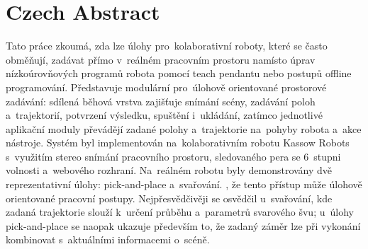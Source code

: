 \section*{Czech Abstract}
%
Tato práce zkoumá, zda lze úlohy pro~kolaborativní roboty, které se často obměňují, zadávat přímo v~reálném pracovním prostoru namísto úprav nízkoúrovňových programů robota pomocí teach pendantu nebo postupů offline programování.
Představuje modulární \DIFdelbegin {}\DIFdelend \DIFaddbegin {}\DIFaddend pro~úlohově orientované prostorové zadávání: sdílená běhová vrstva zajišťuje snímání scény, zadávání poloh a~trajektorií, potvrzení výsledku, spuštění i~ukládání, zatímco jednotlivé aplikační moduly převádějí zadané polohy a~trajektorie na~pohyby robota a~akce nástroje.
Systém byl implementován na~kolaborativním robotu Kassow Robots s~využitím stereo snímání pracovního prostoru, sledovaného pera se 6~stupni volnosti a~webového rozhraní.
Na~reálném robotu byly demonstrovány dvě reprezentativní úlohy: pick-and-place a~svařování.
\DIFdelbegin {}\DIFdelend \DIFaddbegin {}\DIFaddend , že tento přístup může \DIFdelbegin {}\DIFdelend \DIFaddbegin {}\DIFaddend úlohově orientované pracovní postupy.
Nejpřesvědčivěji se osvědčil u~svařování, kde zadaná trajektorie slouží k~určení průběhu a~parametrů svarového švu; u~úlohy pick-and-place se naopak ukazuje především to, že zadaný záměr lze při vykonání kombinovat s~aktuálními informacemi o~scéně\DIFdelbegin {}\DIFdelend .


